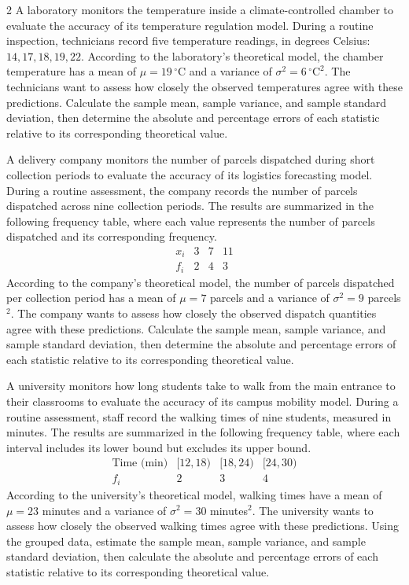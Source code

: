 \begin{multicols}{2}
\label{sec:c7-2}
A laboratory monitors the temperature inside a climate-controlled chamber
to evaluate the accuracy of its temperature regulation model. During a
routine inspection, technicians record five temperature readings, in
degrees Celsius: $14, 17, 18, 19, 22$.
According to the laboratory's theoretical model, the chamber temperature
has a mean of $\mu=19\,^\circ\mathrm{C}$ and a variance of
$\sigma^2=6\,^\circ\mathrm{C}^2$. The technicians want to assess how
closely the observed temperatures agree with these predictions.
Calculate the sample mean, sample variance, and sample standard
deviation, then determine the absolute and percentage errors of each
statistic relative to its corresponding theoretical value. 



\label{sec:c7-3}
A delivery company monitors the number of parcels dispatched during
short collection periods to evaluate the accuracy of its logistics
forecasting model. During a routine assessment, the company records
the number of parcels dispatched across nine collection periods.
The results are summarized in the following frequency table,
where each value represents the number of parcels dispatched
and its corresponding frequency.
\[
\begin{array}{c|rrr}
	x_i&3&7&11\\\hline
	f_i&2&4&3
\end{array}
\]
According to the company's theoretical model, the number of parcels
dispatched per collection period has a mean of $\mu=7$ parcels
and a variance of $\sigma^2=9$ parcels$^2$. The company wants
to assess how closely the observed dispatch quantities agree
with these predictions. Calculate the sample mean, sample variance,
and sample standard deviation, then determine the absolute and
percentage errors of each statistic relative to its corresponding
theoretical value. 


\label{sec:c7-4}
A university monitors how long students take to walk from the main
entrance to their classrooms to evaluate the accuracy of its campus
mobility model. During a routine assessment, staff record the walking
times of nine students, measured in minutes. The results are summarized
in the following frequency table, where each interval includes its
lower bound but excludes its upper bound.
\[
\begin{array}{c|rrr}
	\text{Time (min)}&[12,18)&[18,24)&[24,30)\\\hline
	f_i&2&3&4
\end{array}
\]
According to the university's theoretical model, walking times have
a mean of $\mu=23$ minutes and a variance of $\sigma^2=30$ minutes$^2$.
The university wants to assess how closely the observed walking times
agree with these predictions. Using the grouped data, estimate the
sample mean, sample variance, and sample standard deviation, then
calculate the absolute and percentage errors of each statistic
relative to its corresponding theoretical value. 


\end{multicols}

